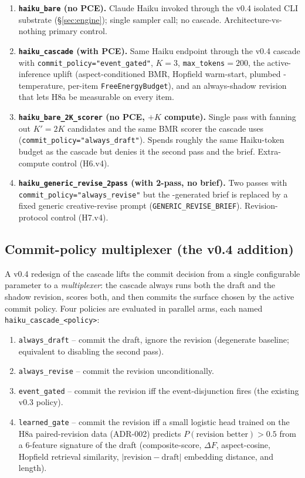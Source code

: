 \begin{enumerate}[leftmargin=1.4em]
\item \textbf{\texttt{haiku\_bare} (no PCE).} Claude Haiku invoked through the v0.4 isolated CLI substrate (\S\ref{sec:engine}); single sampler call; no cascade. Architecture-vs-nothing primary control.
\item \textbf{\texttt{haiku\_cascade} (with PCE).} Same Haiku endpoint through the v0.4 cascade with \texttt{commit\_policy="event\_gated"}, $K{=}3$, \texttt{max\_tokens}$=200$, the active-inference uplift (aspect-conditioned BMR, Hopfield warm-start, plumbed -temperature, per-item \texttt{FreeEnergyBudget}), and an always-shadow revision that lets H8a be measurable on every item.
\item \textbf{\texttt{haiku\_bare\_2K\_scorer} (no PCE, $+K$ compute).} Single pass with  fanning out $K' = 2K$ candidates and the same  BMR scorer the cascade uses (\texttt{commit\_policy="always\_draft"}). Spends roughly the same Haiku-token budget as the cascade but denies it the second pass and the  brief. Extra-compute control (H6.v4).
\item \textbf{\texttt{haiku\_generic\_revise\_2pass} (with 2-pass, no  brief).} Two passes with \texttt{commit\_policy="always\_revise"} but the -generated brief is replaced by a fixed generic creative-revise prompt (\texttt{GENERIC\_REVISE\_BRIEF}). Revision-protocol control (H7.v4).
\end{enumerate}

\subsection{Commit-policy multiplexer (the v0.4 addition)}

A v0.4 redesign of the cascade lifts the commit decision from a single configurable parameter to a \emph{multiplexer}: the cascade always runs both the draft and the shadow revision, scores both, and then commits the surface chosen by the active commit policy. Four policies are evaluated in parallel arms, each named \texttt{haiku\_cascade\_<policy>}:

\begin{enumerate}[leftmargin=1.4em]
\item \texttt{always\_draft} -- commit the draft, ignore the revision (degenerate baseline; equivalent to disabling the second pass).
\item \texttt{always\_revise} -- commit the revision unconditionally.
\item \texttt{event\_gated} -- commit the revision iff the  event-disjunction fires (the existing v0.3 policy).
\item \texttt{learned\_gate} -- commit the revision iff a small logistic head trained on the H8a paired-revision data (ADR-002) predicts $P(\text{revision better})>0.5$ from a 6-feature signature of the draft (composite-score, $\Delta F$, aspect-cosine, Hopfield retrieval similarity, $|\text{revision}-\text{draft}|$ embedding distance, and length).
\end{enumerate}

